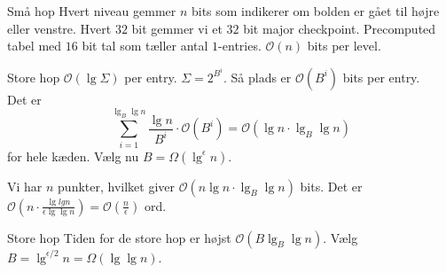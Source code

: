 \documentclass[pdf]{beamer}
\begin{document}
\begin{frame}{Små hop}
  Hvert niveau gemmer $n$ bits som indikerer om bolden er gået til højre eller venstre. Hvert $32$ bit gemmer vi et $32$ bit major checkpoint. Precomputed tabel med $16$ bit tal som tæller antal $1$-entries. $\mathcal{O}(n)$ bits per level.
\end{frame}

\begin{frame}{Store hop}
  $\mathcal{O}(\lg \Sigma)$ per entry. $\Sigma = 2^{B^i}$. Så plads er $\mathcal{O}(B^i)$ bits per entry.\\

  Det er $$\sum_{i=1}^{\lg_B \lg n} \frac{\lg n}{B^i}\cdot\mathcal{O}(B^i) = \mathcal{O}(\lg n \cdot \lg_B \lg n)$$ for hele kæden. Vælg nu $B = \Omega(\lg^\epsilon n)$.


  Vi har $n$ punkter, hvilket giver $\mathcal{O}(n\lg n \cdot\lg_B \lg n)$ bits. Det er $\mathcal{O}(n\cdot\frac{\lg lg n}{\epsilon \lg \lg n}) = \mathcal{O}(\frac{n}{\epsilon})$ ord.
\end{frame}

\begin{frame}{Store hop}
  Tiden for de store hop er højst $\mathcal{O}(B \lg_B \lg n)$. Vælg $B = \lg^{\epsilon / 2} n = \Omega(\lg \lg n)$.
\end{frame}
\end{document}
